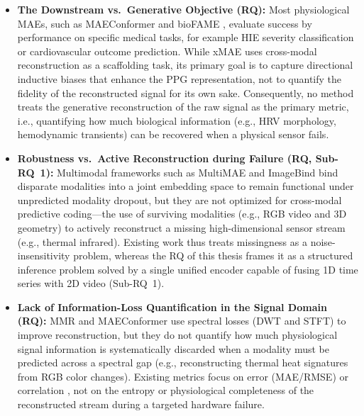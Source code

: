 \begin{itemize}
    \item \textbf{The Downstream vs.\ Generative Objective (RQ):} Most
        physiological MAEs, such as MAEConformer \cite{yu2026maeconformer} and
        bioFAME \cite{liu2024biofame}, evaluate success by performance on
        specific medical tasks, for example HIE severity classification or
        cardiovascular outcome prediction. While xMAE \cite{zhou2026xmae} uses
        cross-modal reconstruction as a scaffolding task, its primary goal is to
        capture directional inductive biases that enhance the PPG representation,
        not to quantify the fidelity of the reconstructed signal for its own
        sake. Consequently, no method treats the generative reconstruction of
        the raw signal as the primary metric, i.e., quantifying how much
        biological information (e.g., HRV morphology, hemodynamic transients)
        can be recovered when a physical sensor fails.

    \item \textbf{Robustness vs.\ Active Reconstruction during Failure (RQ, Sub-RQ~1):}
        Multimodal frameworks such as MultiMAE \cite{bachmann2022multimae} and
        ImageBind \cite{girdhar2023imagebind} bind disparate modalities into a
        joint embedding space to remain functional under unpredicted modality
        dropout, but they are not optimized for cross-modal predictive
        coding---the use of surviving modalities (e.g., RGB video and 3D
        geometry) to actively reconstruct a missing high-dimensional sensor
        stream (e.g., thermal infrared). Existing work thus treats missingness
        as a noise-insensitivity problem, whereas the RQ of this thesis frames
        it as a structured inference problem solved by a single unified encoder
        capable of fusing 1D time series with 2D video (Sub-RQ~1).

    \item \textbf{Lack of Information-Loss Quantification in the Signal Domain (RQ):}
        MMR \cite{thukral2026wavelet} and MAEConformer \cite{yu2026maeconformer}
        use spectral losses (DWT and STFT) to improve reconstruction, but they do
        not quantify how much physiological signal information is systematically
        discarded when a modality must be predicted across a spectral gap (e.g.,
        reconstructing thermal heat signatures from RGB color changes). Existing
        metrics focus on error (MAE/RMSE) or correlation \cite{savic2024physunet},
        not on the entropy or physiological completeness of the reconstructed
        stream during a targeted hardware failure.
\end{itemize}

